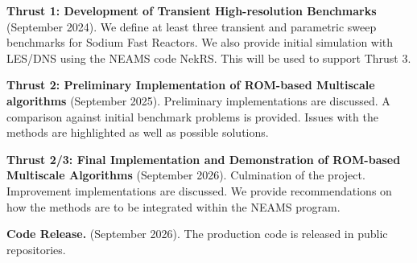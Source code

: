 \vspace*{-.10in}
\noindent \textbf{Thrust 1: Development of Transient High-resolution
Benchmarks} (September 2024). We define at least three transient and parametric
sweep benchmarks for Sodium Fast Reactors. We also provide initial simulation
with LES/DNS using the NEAMS code NekRS. This will be used to support Thrust 3.

\noindent \textbf{Thrust 2: Preliminary Implementation of ROM-based Multiscale
algorithms} (September 2025). Preliminary implementations are discussed. A
comparison against initial benchmark problems is provided. Issues with the
methods are highlighted as well as possible solutions.

\noindent \textbf{Thrust 2/3: Final Implementation and Demonstration of
ROM-based Multiscale Algorithms} (September 2026).
Culmination of the project. Improvement implementations are discussed. We
provide recommendations on how the methods are to be integrated within the
NEAMS program.

\noindent \textbf{Code Release.} (September 2026). The production code is
released in public repositories.


